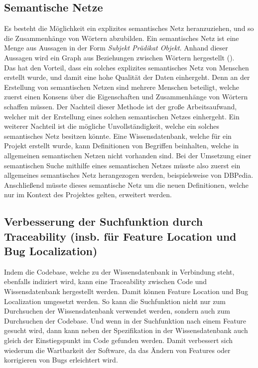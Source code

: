 
\subsection{Semantische Netze}
Es besteht die Möglichkeit ein explizites semantisches Netz heranzuziehen, und so die Zusammenhänge von Wörtern abzubilden.
Ein semantisches Netz ist eine Menge aus Aussagen in der Form \textit{Subjekt Prädikat Objekt}.
Anhand dieser Aussagen wird ein Graph aus Beziehungen zwischen Wörtern hergestellt (\cite{Lehmann}).\\


Das hat den Vorteil, dass ein solches explizites semantisches Netz von Menschen erstellt wurde, und damit eine hohe Qualität der Daten einhergeht.
Denn an der Erstellung von semantischen Netzen sind mehrere Menschen beteiligt, welche zuerst einen Konsens über die Eigenschaften und Zusammenhänge von Wörtern schaffen müssen.
Der Nachteil dieser Methode ist der große Arbeitsaufwand, welcher mit der Erstellung eines solchen semantischen Netzes einhergeht.
Ein weiterer Nachteil ist die mögliche Unvollständigkeit, welche ein solches semantisches Netz besitzen könnte.
Eine Wissensdatenbank, welche für ein Projekt erstellt wurde, kann Definitionen von Begriffen beinhalten, welche in allgemeinen semantischen Netzen nicht vorhanden sind.
Bei der Umsetzung einer semantischen Suche mithilfe eines semantischen Netzes müsste also zuerst ein allgemeines semantisches Netz herangezogen werden, beispielsweise von DBPedia.
Anschließend müsste dieses semantische Netz um die neuen Definitionen, welche nur im Kontext des Projektes gelten, erweitert werden.\\



\subsection{Verbesserung der Suchfunktion durch Traceability (insb. für Feature Location und Bug Localization)}
Indem die Codebase, welche zu der Wissensdatenbank in Verbindung steht, ebenfalls indiziert wird, kann eine Traceability zwischen Code und Wissensdatenbank hergestellt werden.
Damit können Feature Location und Bug Localization umgesetzt werden.
So kann die Suchfunktion nicht nur zum Durchsuchen der Wissensdatenbank verwendet werden, sondern auch zum Durchsuchen der Codebase.
Und wenn in der Suchfunktion nach einem Feature gesucht wird, dann kann neben der Spezifikation in der Wissensdatenbank auch gleich der Einstiegspunkt im Code gefunden werden.
Damit verbessert sich wiederum die Wartbarkeit der Software, da das Ändern von Features oder korrigieren von Bugs erleichtert wird.\\


